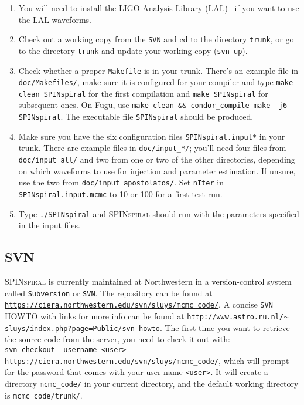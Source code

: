 \begin{enumerate}
\item You will need to install the LIGO Analysis Library (LAL)~\cite{lal} if you want to use the LAL waveforms.
\item Check out a working copy from the \texttt{SVN} and cd to the directory \texttt{trunk}, or go to the
  directory \texttt{trunk} and update your working copy (\texttt{svn up}).
\item Check whether a proper \texttt{Makefile} is in your trunk.  There's an example file in \texttt{doc/Makefiles/}, 
  make sure it is configured for your compiler and type \texttt{make clean SPINspiral} for the first compilation
  and \texttt{make SPINspiral} for subsequent ones.  On Fugu, use \texttt{make clean \&\& condor\_compile make -j6 SPINspiral}.
  The executable file \texttt{SPINspiral} should be produced.
\item Make sure you have the six configuration files \texttt{SPINspiral.input*} in your trunk.  There are example
  files in \texttt{doc/input\_*/}; you'll need four files from \texttt{doc/input\_all/} and two from one or two of the other
  directories, depending on which waveforms to use for injection and parameter estimation.  If unsure, use the two from
  \texttt{doc/input\_apostolatos/}.  Set \texttt{nIter} in \texttt{SPINspiral.input.mcmc} to 10 or 100 for a first test run.
\item Type \texttt{./SPINspiral} and \textsc{SPINspiral} should run with the parameters specified in the input files.
\end{enumerate}



\subsection{SVN}

\textsc{SPINspiral} is currently maintained at Northwestern in a version-control system called \texttt{Subversion} or \texttt{SVN}.  The
repository can be found at \texttt{\href{https://ciera.northwestern.edu/svn/sluys/mcmc_code/}{https://ciera.northwestern.edu/svn/sluys/mcmc\_code/}}.
A concise \texttt{SVN} HOWTO with links for more info can be found at
\texttt{\href{http://www.astro.ru.nl/~sluys/index.php?page=Public/svn-howto}{http://www.astro.ru.nl/$\sim$sluys/index.php?page=Public/svn-howto}}.  
The first time you want
to retrieve the source code from the server, you need to check it out with: \\ 
\texttt{svn checkout --username <user> https://ciera.northwestern.edu/svn/sluys/mcmc\_code/},
which will prompt for the password that comes with your user name \texttt{<user>}.  It will create a directory \texttt{mcmc\_code/} in your current 
directory, and the default working directory is \texttt{mcmc\_code/trunk/}.





